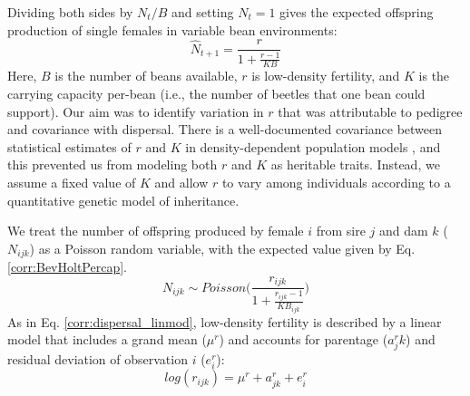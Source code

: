 \documentclass[11pt]{article}
\begin{document}
Dividing both sides by $N_{t}/B$ and setting $N_{t}=1$ gives the expected offspring production of single females in variable bean environments:
%
\begin{equation}\label{corr:BevHoltPercap}
  \hat{N}_{t+1} = \frac{r}{1 + \frac{r-1}{KB}}
\end{equation}
%
Here, $B$ is the number of beans available, $r$ is low-density fertility, and $K$ is the carrying capacity per-bean (i.e., the number of beetles that one bean could support).
Our aim was to identify variation in $r$ that was attributable to pedigree and covariance with dispersal.
There is a well-documented covariance between statistical estimates of $r$ and $K$ in density-dependent population models \citep{hilborn_quantitative_1992}, and this prevented us from modeling both $r$ and $K$ as heritable traits.
Instead, we assume a fixed value of $K$ and allow $r$ to vary among individuals according to a quantitative genetic model of inheritance.

We treat the number of offspring produced by female $i$ from sire $j$ and dam $k$ ($N_{ijk}$) as a Poisson random variable, with the expected value given by Eq. \ref{corr:BevHoltPercap}.
%
\begin{equation}\label{corr:Noff_ran}
  N_{ijk} \sim \mathit{Poisson}\Big(\frac{r_{ijk}} {1 + \frac{r_{ijk}-1}{KB_{ijk} }}\Big)
\end{equation}
%
As in Eq. \ref{corr:dispersal_linmod}, low-density fertility is described by a linear model that includes a grand mean ($\mu^{r}$) and accounts for parentage ($a^{r}_jk$) and residual deviation of observation $i$ ($e^{r}_i$):
%
\begin{equation} \label{corr:fert_linmod}
  log(r_{ijk}) = \mu^{r} + a^{r}_{jk} + e^{r}_{i}
\end{equation}
%
\end{document}
